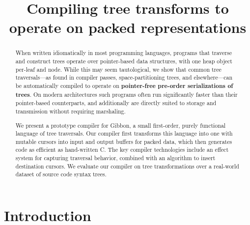 \documentclass[a4paper,english]{lipics-v2016}
\title{Compiling tree transforms to operate on packed representations}
\author[1]{}
\begin{document}
\maketitle

\begin{abstract}
When written idiomatically in most programming languages, programs that traverse
and construct trees operate over pointer-based data structures, with one heap
object per-leaf and node.  While this may seem tautological, we show that common
tree traversals---as found in compiler passes, space-partitioning trees, and
elsewhere---can  be automatically compiled to operate on \textbf{pointer-free
pre-order serializations of trees}.  On modern architectures such programs
often run {significantly} faster than their pointer-based counterparts,
{and additionally are directly suited to storage and transmission without
  requiring marshaling.}

We present a prototype compiler for \textsf{Gibbon}, a small
first-order, purely functional language of tree traversals.  Our
compiler first transforms this language into one with
mutable cursors into input and output buffers
for packed data, which then generates code as efficient as
hand-written C. The key compiler technologies include an effect
system for capturing traversal behavior, combined with an
algorithm to insert destination cursors.
We evaluate our compiler on 
tree transformations over a real-world dataset of source code syntax trees.

\end{abstract}




\section{Introduction}\label{sec:intro}

\end{document}
